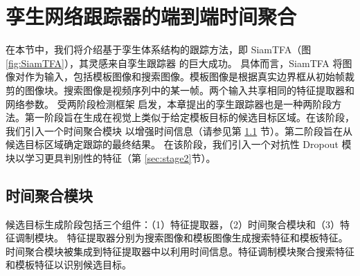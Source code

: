 \section{孪生网络跟踪器的端到端时间聚合}
\label{sec:method}
在本节中，我们将介绍基于孪生体系结构的跟踪方法，即 SiamTFA（图 \ref{fig:SiamTFA}），其灵感来自孪生跟踪器 \cite{SiamRPN++, Wang2018SiamMask} 的巨大成功。
具体而言，SiamTFA 将图像对作为输入，包括模板图像和搜索图像。模板图像是根据真实边界框从初始帧裁剪的图像块。搜索图像是视频序列中的某一帧。两个输入共享相同的特征提取器和网络参数。
受两阶段检测框架 \cite{ren2015faster} 启发，本章提出的孪生跟踪器也是一种两阶段方法。第一阶段旨在生成在视觉上类似于给定模板目标的候选目标区域。在该阶段，我们引入一个时间聚合模块
以增强时间信息（请参见第 \ref{sec:stage1} 节）。第二阶段旨在从候选目标区域确定跟踪的最终结果。
在该阶段，我们引入一个对抗性 Dropout 模块以学习更具判别性的特征（第 \ref{sec:stage2}节）。

\subsection{时间聚合模块}
\label{sec:stage1}
候选目标生成阶段包括三个组件：（1）特征提取器，（2）时间聚合模块和（3）特征调制模块。
特征提取器分别为搜索图像和模板图像生成搜索特征和模板特征。时间聚合模块被集成到特征提取器中以利用时间信息。特征调制模块聚合搜索特征和模板特征以识别候选目标。

